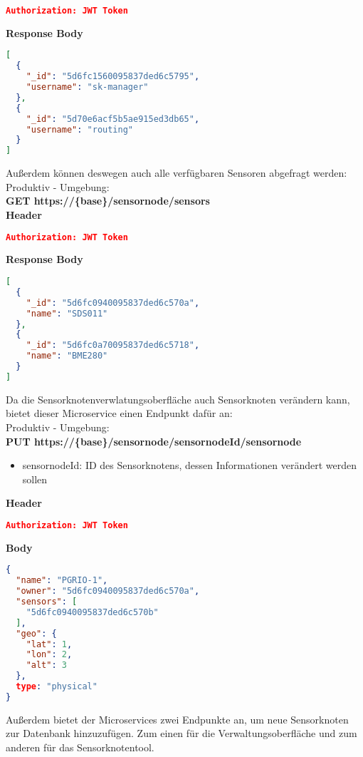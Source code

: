 \begin{lstlisting}[language=json,firstnumber=1,basicstyle=\footnotesize]
Authorization: JWT Token
\end{lstlisting}
\textbf{Response Body}
\begin{lstlisting}[language=json,firstnumber=1,basicstyle=\footnotesize]
[
  {
    "_id": "5d6fc1560095837ded6c5795",
    "username": "sk-manager"
  },
  {
    "_id": "5d70e6acf5b5ae915ed3db65",
    "username": "routing"
  }
]
\end{lstlisting}
Außerdem können deswegen auch alle verfügbaren Sensoren abgefragt werden:\\
Produktiv - Umgebung:\\
\textbf{GET https://\{base\}/sensornode/sensors}
\\
\textbf{Header}
\begin{lstlisting}[language=json,firstnumber=1,basicstyle=\footnotesize]
Authorization: JWT Token
\end{lstlisting}
\textbf{Response Body}
\begin{lstlisting}[language=json,firstnumber=1,basicstyle=\footnotesize]
[
  {
    "_id": "5d6fc0940095837ded6c570a",
    "name": "SDS011"
  },
  {
    "_id": "5d6fc0a70095837ded6c5718",
    "name": "BME280"
  }
]
\end{lstlisting}
Da die Sensorknotenverwlatungsoberfläche auch Sensorknoten verändern kann, bietet dieser Microservice einen Endpunkt dafür an:
\\
Produktiv - Umgebung:
\\
\textbf{PUT https://\{base\}/sensornode/sensornodeId/sensornode}
\begin{itemize}
	\item sensornodeId: ID des Sensorknotens, dessen Informationen verändert werden sollen
\end{itemize}
\textbf{Header}
\begin{lstlisting}[language=json,firstnumber=1,basicstyle=\footnotesize]
Authorization: JWT Token
\end{lstlisting}
\textbf{Body}
\begin{lstlisting}[language=json,firstnumber=1,basicstyle=\footnotesize]
{
  "name": "PGRIO-1",
  "owner": "5d6fc0940095837ded6c570a",
  "sensors": [
    "5d6fc0940095837ded6c570b"	
  ],
  "geo": {
    "lat": 1,
    "lon": 2,
    "alt": 3
  },
  type: "physical"
}
\end{lstlisting}
Außerdem bietet der Microservices zwei Endpunkte an, um neue Sensorknoten zur Datenbank hinzuzufügen.
Zum einen für die Verwaltungsoberfläche und zum anderen für das Sensorknotentool.
